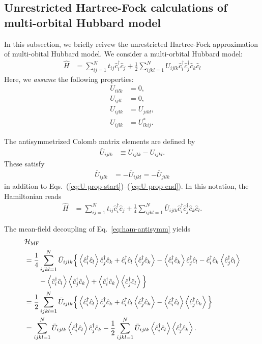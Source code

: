 \documentclass[submission, LectureNotes]{SciPost}
\begin{document}
{\clearpage
\subsection{Unrestricted Hartree-Fock calculations of multi-orbital Hubbard model}
In this subsection, we briefly reivew the unrestricted Hartree-Fock approximation of multi-obital Hubbard model.
We consider a multi-orbital Hubbard model:
\begin{align}
    \hat{H} &= \sum_{ij=1}^N t_{ij} \hat{c}^\dagger_i \hat{c}_j + \frac{1}{2} \sum_{ijkl=1}^N U_{ijlk}\hat{c}^\dagger_i \hat{c}^\dagger_j \hat{c}_k \hat{c}_l
\end{align}
Here, we \textit{assume} the following properties:
\begin{align}
U_{iilk} &= 0,\label{eq:U-prop-start}\\
U_{ijll} &= 0,\\
U_{ijlk} &= U_{jikl}, \\
U_{ijlk} &= U_{lkij}^*.\label{eq:U-prop-end}
\end{align}

The antisymmetrized Colomb matrix elements are defined by
\begin{align}
    \bar{U}_{ijlk} &\equiv U_{ijlk} - U_{ijkl}.
\end{align}
These satisfy
\begin{align}
\bar{U}_{ijlk} &= -\bar{U}_{ijkl} = -\bar{U}_{jilk}
\end{align}
in addition to Eqs.~(\ref{eq:U-prop-start})--(\ref{eq:U-prop-end}).
In this notation, the Hamiltonian reads
\begin{align}
    \hat{H} &= \sum_{ij=1}^N t_{ij} \hat{c}^\dagger_i \hat{c}_j + \frac{1}{4} \sum_{ijkl=1}^N \bar{U}_{ijlk}\hat{c}^\dagger_i \hat{c}^\dagger_j \hat{c}_k \hat{c}_l.\label{eq:ham-antisymm}
\end{align}

The mean-field decoupling of Eq.~\eqref{eq:ham-antisymm} yields
\begin{align}
& \mathcal{H}_\mathrm{MF} \nonumber \\
& = \frac{1}{4} \sum_{ijkl=1}^N \bar{U}_{ijlk}
\Big\{
\expval{\hat{c}^\dagger_i \hat{c}_l} \hat{c}^\dagger_j \hat{c}_k
+\hat{c}^\dagger_i \hat{c}_l \expval{\hat{c}^\dagger_j \hat{c}_k}
-\expval{\hat{c}^\dagger_i \hat{c}_k} \hat{c}^\dagger_j \hat{c}_l
-\hat{c}^\dagger_i \hat{c}_k \expval{\hat{c}^\dagger_j \hat{c}_l}\\
&\hspace{2em} - \expval{\hat{c}^\dagger_i \hat{c}_l} \expval{\hat{c}^\dagger_j \hat{c}_k} + \expval{\hat{c}^\dagger_i \hat{c}_k} \expval{\hat{c}^\dagger_j \hat{c}_l}
\Big\}\nonumber\\
& = \frac{1}{2} \sum_{ijkl=1}^N \bar{U}_{ijlk}
\Big\{
\expval{\hat{c}^\dagger_i \hat{c}_l} \hat{c}^\dagger_j \hat{c}_k
+\hat{c}^\dagger_i \hat{c}_l \expval{\hat{c}^\dagger_j \hat{c}_k}
-\expval{\hat{c}^\dagger_i \hat{c}_l} \expval{\hat{c}^\dagger_j \hat{c}_k} 
\Big\}\nonumber \\
&= \sum_{ijkl=1}^N \bar{U}_{ijlk}
\expval{\hat{c}^\dagger_i \hat{c}_l} \hat{c}^\dagger_j \hat{c}_k
-\frac{1}{2}\sum_{ijkl=1}^N \bar{U}_{ijlk}\expval{\hat{c}^\dagger_i \hat{c}_l} \expval{\hat{c}^\dagger_j \hat{c}_k} 
.
\end{align}

}
\end{document}
